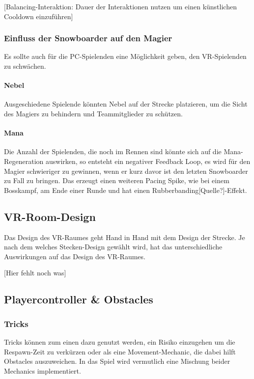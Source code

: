 [Balancing-Interaktion: Dauer der Interaktionen nutzen um einen künstlichen Cooldown einzuführen]

\subsubsection{Einfluss der Snowboarder auf den Magier}

Es sollte auch für die PC-Spielenden eine Möglichkeit geben, den VR-Spielenden zu schwächen.

\paragraph{Nebel}
Ausgeschiedene Spielende könnten Nebel auf der Strecke platzieren, um die Sicht des Magiers zu behindern und Teammitglieder zu schützen.

\paragraph{Mana}
Die Anzahl der Spielenden, die noch im Rennen sind könnte sich auf die Mana-Regeneration auswirken, so entsteht ein negativer Feedback Loop, es wird für den Magier schwieriger zu gewinnen, wenn er kurz davor ist den letzten Snowboarder zu Fall zu bringen. Das erzeugt einen weiteren Pacing Spike, wie bei einem Bosskampf, am Ende einer Runde und hat einen Rubberbanding[Quelle?]-Effekt.

\subsection{VR-Room-Design}

Das Design des VR-Raumes geht Hand in Hand mit dem Design der Strecke. Je nach dem welches Stecken-Design gewählt wird, hat das unterschiedliche Auswirkungen auf das Design des VR-Raumes.

[Hier fehlt noch was]

\subsection{Playercontroller \& Obstacles\label{_playercontroller}}
\subsubsection{Tricks}
Tricks können zum einen dazu genutzt werden, ein Risiko einzugehen um die Respawn-Zeit zu verkürzen oder als eine Movement-Mechanic, die dabei hilft Obstacles auszuweichen. In das Spiel wird vermutlich eine Mischung beider Mechanics implementiert.

